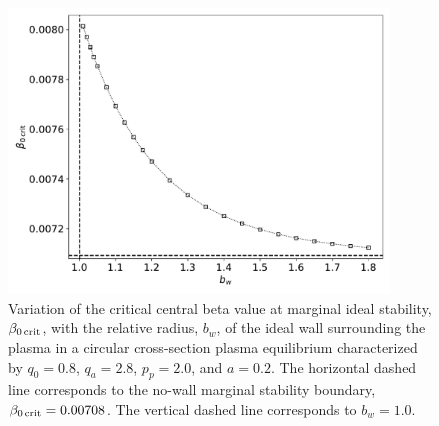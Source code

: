 \documentclass[12pt,prb,aps]{revtex4-1}
\begin{document}
\begin{figure}
\centerline{\includegraphics[width=0.9\textwidth]{Fig22.pdf}}
\caption{Variation of the critical central beta value at marginal ideal stability, $\beta_{0\,{\rm crit}}$, with the relative radius, $b_w$, of the ideal wall surrounding the plasma in 
a circular cross-section plasma equilibrium characterized by $q_0=0.8$, $q_a= 2.8$, $p_p=2.0$, and
$a=0.2$. The horizontal dashed line corresponds to the no-wall  marginal stability boundary, $\beta_{0\,{\rm crit}}=0.00708$. The vertical dashed line corresponds to $b_w=1.0$.  \label{fig22}}
\end{figure}
\end{document}
